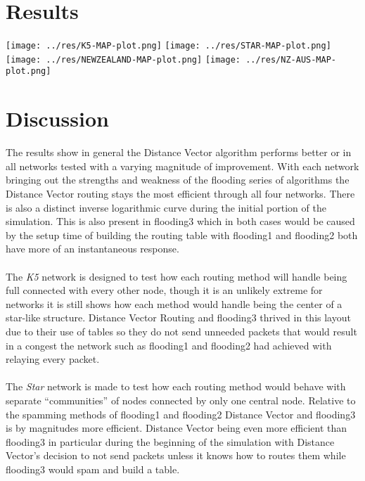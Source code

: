 \documentclass[11pt]{article}
\begin{document}
\section*{Results}

\begin{center}
\texttt{[image: ../res/K5-MAP-plot.png]}
\texttt{[image: ../res/STAR-MAP-plot.png]}
\texttt{[image: ../res/NEWZEALAND-MAP-plot.png]}
\texttt{[image: ../res/NZ-AUS-MAP-plot.png]}
\end{center}

\section*{Discussion}

The results show in general the Distance Vector algorithm performs better or
in all networks tested with a varying magnitude of improvement. With each
network bringing out the strengths and weakness of the flooding series of
algorithms the Distance Vector routing stays the most efficient through all
four networks. There is also a distinct inverse logarithmic curve during the
initial portion of the simulation. This is also present in flooding3 which in
both cases would be caused by the setup time of building the routing table
with flooding1 and flooding2 both have more of an instantaneous response.

\paragraph{}
The \emph{K5} network is designed to test how each routing method will handle
being full connected with every other node, though it is an unlikely extreme for
networks it is still shows how each method would handle being the center of a
star-like structure. Distance Vector Routing and flooding3 thrived in this
layout due to their use of tables so they do not send unneeded packets that
would result in a congest the network such as flooding1 and flooding2 had
achieved with relaying every packet.

\paragraph{}
The \emph{Star} network is made to test how each routing method would behave
with separate ``communities'' of nodes connected by only one central node.
Relative to the spamming methods of flooding1 and flooding2 Distance Vector and
flooding3 is by magnitudes more efficient. Distance Vector being even more
efficient than flooding3 in particular during the beginning of the simulation
with Distance Vector's decision to not send packets unless it knows how to
routes them while flooding3 would spam and build a table.
\end{document}
